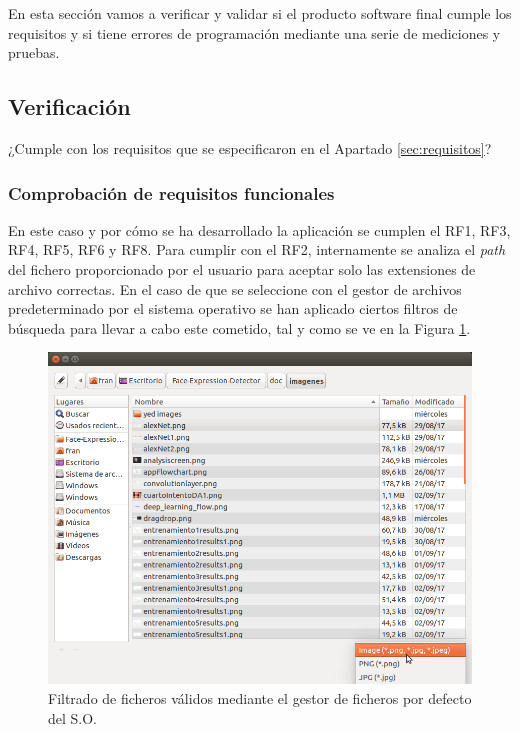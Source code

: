 \documentclass[a4paper,11pt]{book}
\begin{document}
En esta sección vamos a verificar y validar si el producto software final cumple los requisitos y si tiene errores de programación mediante una serie de mediciones y pruebas. 
\subsection{Verificación}\label{subsec:verificacion}
¿Cumple con los requisitos que se especificaron en el Apartado \ref{sec:requisitos}?\\
\subsubsection{Comprobación de requisitos funcionales}
En este caso y por cómo se ha desarrollado la aplicación se cumplen el RF1, RF3, RF4, RF5, RF6 y RF8. Para cumplir con el RF2, internamente se analiza el \textit{path} del fichero proporcionado por el usuario para aceptar solo las extensiones de archivo correctas. En el caso de que se seleccione con el gestor de archivos predeterminado por el sistema operativo se han aplicado ciertos filtros de búsqueda para llevar a cabo este cometido, tal y como se ve en la Figura \ref{fig:filters}.\\
\begin{figure}[h]
\centering
\includegraphics[width=0.7\linewidth]{imagenes/filters}
\caption[Filtros]{Filtrado de ficheros válidos mediante el gestor de ficheros por defecto del S.O.}
\label{fig:filters}
\end{figure}
\end{document}
